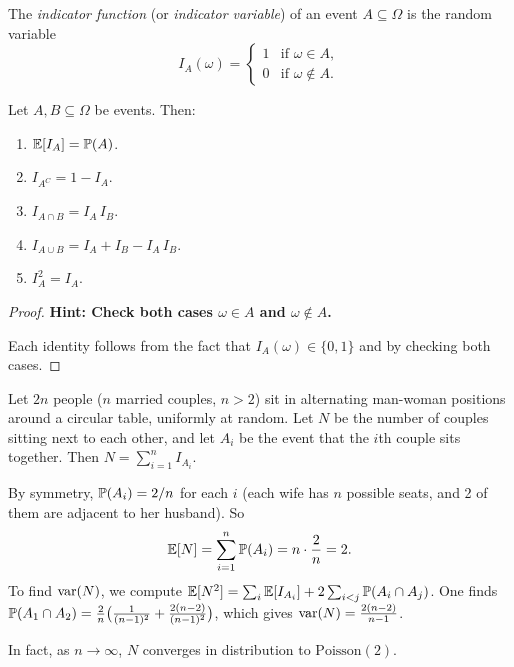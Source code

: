 \documentclass[a4paper]{article}
\begin{document}
\begin{defi}
  The \emph{indicator function} (or \emph{indicator variable}) of an event $A\subseteq \Omega$ is the random variable
  \[
    I_A(\omega) =
    \begin{cases}
      1 & \text{if } \omega\in A,\\
      0 & \text{if } \omega\not\in A.
    \end{cases}
  \]
\end{defi}

\begin{prop}
  Let $A, B \subseteq \Omega$ be events. Then:
  \begin{enumerate}
    \item $\E[I_A] = \P(A)$.
    \item $I_{A^C} = 1 - I_A$.
    \item $I_{A\cap B} = I_A\, I_B$.
    \item $I_{A\cup B} = I_A + I_B - I_A\, I_B$.
    \item $I_A^2 = I_A$.
  \end{enumerate}
\end{prop}

\begin{proof}
  \textbf{Hint: Check both cases $\omega \in A$ and $\omega \notin A$.}

  Each identity follows from the fact that $I_A(\omega) \in \{0, 1\}$ and by checking both cases.
\end{proof}

\begin{eg}
  Let $2n$ people ($n$ married couples, $n > 2$) sit in alternating man-woman positions around a circular table, uniformly at random. Let $N$ be the number of couples sitting next to each other, and let $A_i$ be the event that the $i$th couple sits together. Then $N = \sum_{i = 1}^n I_{A_i}$.

  By symmetry, $\P(A_i) = 2/n$ for each $i$ (each wife has $n$ possible seats, and 2 of them are adjacent to her husband). So
  \[
    \E[N] = \sum_{i=1}^n \P(A_i) = n\cdot \frac{2}{n} = 2.
  \]
  To find $\var(N)$, we compute $\E[N^2] = \sum_i \E[I_{A_i}] + 2\sum_{i < j}\P(A_i \cap A_j)$.  One finds $\P(A_1\cap A_2) = \frac{2}{n}\bigl(\frac{1}{(n - 1)^2} + \frac{2(n - 2)}{(n - 1)^2}\bigr)$, which gives $\var(N) = \frac{2(n- 2)}{n - 1}$.

  In fact, as $n\to \infty$, $N$ converges in distribution to $\mathrm{Poisson}(2)$.
\end{eg}
\end{document}
